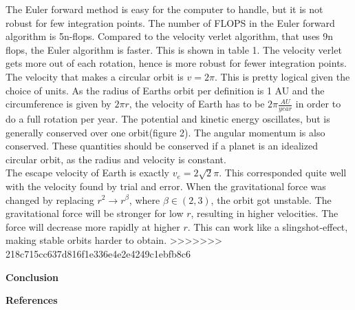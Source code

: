 \documentclass[10pt,a4paper]{article}
\begin{document}
\noindent The Euler forward method is easy for the computer to handle, but it is not robust for few integration points. The number of FLOPS in the Euler forward algorithm is 5n-flops. Compared to the velocity verlet algorithm, that uses 9n flops, the Euler algorithm is faster. This is shown in table 1. The velocity verlet gets more out of each rotation, hence is more robust for fewer integration points. The velocity that makes a circular orbit is $v=2\pi$. This is pretty logical given the choice of units. As the radius of Earths orbit per definition is 1 AU and the circumference is given by $2\pi r$, the velocity of Earth has to be $2\pi \frac{AU}{year}$ in order to do a full rotation per year. The potential and kinetic energy oscillates, but is generally conserved over one orbit(figure 2). The angular momentum is also conserved. These quantities should be conserved if a planet is an idealized circular orbit, as the radius and velocity is constant.  \\

\noindent The escape velocity of Earth is exactly $v_e=2\sqrt{2}\pi$. This corresponded quite well with the velocity found by trial and error. When the gravitational force was changed by replacing $r^2\rightarrow r^\beta$, where $\beta \in(2,3)$, the orbit got unstable. The gravitational force will be stronger for low $r$, resulting in higher velocities. The force will decrease more rapidly at higher $r$. This can work like a slingshot-effect, making stable orbits harder to obtain.  
>>>>>>> 218c715cc637d816f1e336e4e2e4249c1ebfb8c6






\newpage
{\LARGE\bf
Conclusion
}









\newpage
{\LARGE\bf
References
}
\end{document}
